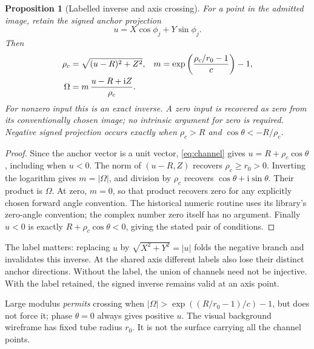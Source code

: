 \documentclass[11pt,a4paper]{article}
\newtheorem{proposition}[theorem]{Proposition}
\theoremstyle{definition}
\theoremstyle{remark}
\newcommand{\ii}{\mathrm i}
\begin{document}
\begin{proposition}[Labelled inverse and axis crossing]
\label{prop:channel}
For a point in the admitted image, retain the signed anchor
projection
\[
 u=X\cos\phi_j+Y\sin\phi_j.
 \]
Then
\begin{align}
 \rho_c&=\sqrt{(u-R)^2+Z^2},&
 m&=\exp\left(\frac{\rho_c/r_0-1}{c}\right)-1,\notag\\
 \Omega&=m\,\frac{u-R+\ii Z}{\rho_c}. \label{eq:channelinverse}
\end{align}
For nonzero input this is an exact inverse. A zero input is
recovered as zero from its conventionally chosen image; no
intrinsic argument for zero is required.
Negative signed projection occurs exactly when
$\rho_c>R$ and $\cos\theta<-R/\rho_c$.
\end{proposition}
\begin{proof}
Since the anchor vector is a unit vector, \eqref{eq:channel}
gives $u=R+\rho_c\cos\theta$, including when $u<0$.
The norm of $(u-R,Z)$ recovers $\rho_c\geq r_0>0$.
Inverting the logarithm gives $m=|\Omega|$, and division by
$\rho_c$ recovers $\cos\theta+\ii\sin\theta$. Their product
is $\Omega$. At zero, $m=0$, so that product recovers zero
for any explicitly chosen forward angle convention. The
historical numeric routine uses its library's zero-angle
convention; the complex number zero itself has no argument.
Finally $u<0$ is exactly $R+\rho_c\cos\theta<0$, giving the
stated pair of conditions.
\end{proof}

The label matters: replacing $u$ by $\sqrt{X^2+Y^2}=|u|$
folds the negative branch and invalidates this inverse.
At the shared axis different labels also lose their distinct
anchor directions. Without the label, the union of channels
need not be injective. With the label retained, the signed
inverse remains valid at an axis point.

Large modulus \emph{permits} crossing when
$|\Omega|>\exp((R/r_0-1)/c)-1$, but does not force it;
phase $\theta=0$ always gives positive $u$.
The visual background wireframe has fixed tube radius $r_0$.
It is not the surface carrying all the channel points.
\end{document}
